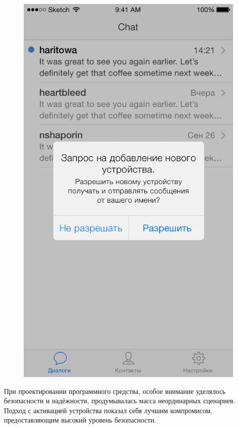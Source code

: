 \begin{figure}[H]
\begin{minipage}{.5\textwidth}
  \includegraphics[height=0.25\textheight]{inc/img/ui/add_new_device_notification.png}
  \label{sec:usage:deviceactivation:olddevice}
\end{minipage}
\end{figure}

При проектировании программного средства, особое внимание уделялось безопасности и надёжности, продумывалась масса неординарных сценариев. Подход с активацией устройства показал себя лучшим компромисом, предоставляющим высокий уровень безопасности.